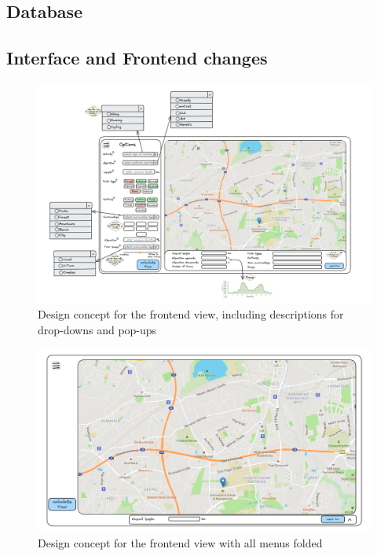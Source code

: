 \subsection{Database}
\label{subsection:database}

\subsection{Interface and Frontend changes}
\label{subsec:interfaceAndFrontendChanges}

\begin{figure}[H]
	\includegraphics[width=0.9\linewidth]{bilder/Concept new Frontend design.png}
	\caption{Design concept for the frontend view, including descriptions for drop-downs and pop-ups}
	\label{fig:frontendConcept}
\end{figure}


\begin{figure}[H]
	\includegraphics[width=0.9\linewidth]{bilder/Concept burger menu and stats hidden.png}
	\caption{Design concept for the frontend view with all menus folded}
	\label{fig:frontendConceptMenusClosed}
\end{figure}


